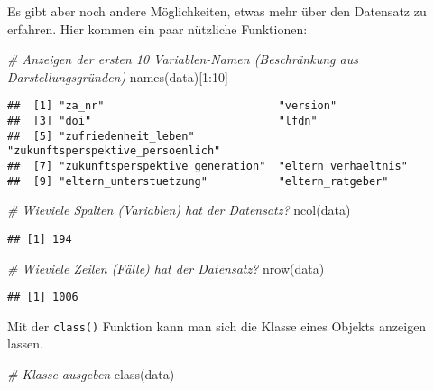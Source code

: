 \documentclass[
]{book}
\newenvironment{Shaded}{\begin{snugshade}}{\end{snugshade}}
\newcommand{\CommentTok}[1]{\textcolor[rgb]{0.56,0.35,0.01}{\textit{#1}}}
\newcommand{\DecValTok}[1]{\textcolor[rgb]{0.00,0.00,0.81}{#1}}
\newcommand{\FunctionTok}[1]{\textcolor[rgb]{0.00,0.00,0.00}{#1}}
\newcommand{\NormalTok}[1]{#1}
\newcommand{\SpecialCharTok}[1]{\textcolor[rgb]{0.00,0.00,0.00}{#1}}
\begin{document}
Es gibt aber noch andere Möglichkeiten, etwas mehr über den Datensatz zu erfahren. Hier kommen ein paar nützliche Funktionen:

\begin{Shaded}
\begin{Highlighting}[]
\CommentTok{\# Anzeigen der ersten 10 Variablen{-}Namen (Beschränkung aus Darstellungsgründen)}
\FunctionTok{names}\NormalTok{(data)[}\DecValTok{1}\SpecialCharTok{:}\DecValTok{10}\NormalTok{]}
\end{Highlighting}
\end{Shaded}

\begin{verbatim}
##  [1] "za_nr"                           "version"                        
##  [3] "doi"                             "lfdn"                           
##  [5] "zufriedenheit_leben"             "zukunftsperspektive_persoenlich"
##  [7] "zukunftsperspektive_generation"  "eltern_verhaeltnis"             
##  [9] "eltern_unterstuetzung"           "eltern_ratgeber"
\end{verbatim}

\begin{Shaded}
\begin{Highlighting}[]
\CommentTok{\# Wieviele Spalten (Variablen) hat der Datensatz?}
\FunctionTok{ncol}\NormalTok{(data)}
\end{Highlighting}
\end{Shaded}

\begin{verbatim}
## [1] 194
\end{verbatim}

\begin{Shaded}
\begin{Highlighting}[]
\CommentTok{\# Wieviele Zeilen (Fälle) hat der Datensatz?}
\FunctionTok{nrow}\NormalTok{(data)}
\end{Highlighting}
\end{Shaded}

\begin{verbatim}
## [1] 1006
\end{verbatim}

Mit der \texttt{class()} Funktion kann man sich die Klasse eines Objekts anzeigen lassen.

\begin{Shaded}
\begin{Highlighting}[]
\CommentTok{\# Klasse ausgeben}
\FunctionTok{class}\NormalTok{(data)}
\end{Highlighting}
\end{Shaded}
\end{document}
